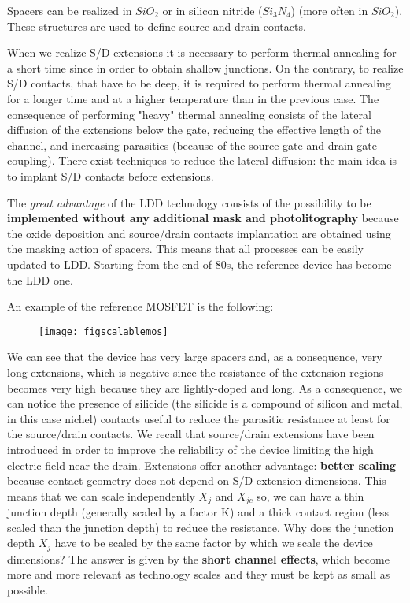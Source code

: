 \documentclass[a4paper, 12pt, twoside, openright]{report}
\begin{document}
{Spacers can be realized in $SiO_{2}$ or in silicon nitride ($Si_{3}N_{4}$) (more often in $SiO_{2}$). These structures are used to define source and drain contacts.

When we realize S/D extensions it is necessary to perform thermal annealing for a short time since in order to obtain shallow junctions. On the contrary, to realize S/D contacts, that have to be deep, it is required to perform thermal annealing for a longer time and at a higher temperature than in the previous case. The consequence of performing "heavy" thermal annealing consists of the lateral diffusion of the extensions below the gate, reducing the effective length of the channel, and increasing parasitics (because of the source-gate and drain-gate coupling). There exist techniques to reduce the lateral diffusion: the main idea is to implant S/D contacts before extensions.

The \emph{great advantage} of the LDD technology consists of the possibility to be \textbf{implemented without any additional mask and photolitography} because the oxide deposition and source/drain contacts implantation are obtained using the masking action of spacers. This means that all processes can be easily updated to LDD. Starting from the end of 80s, the reference device has become the LDD one. 

An example of the reference MOSFET is the following:

\newpage

	\begin{figure}[H]
	\centering
	\texttt{[image: figscalablemos]}
	\caption{}
	\label{}
	\end{figure}

We can see that the device has very large spacers and, as a consequence, very long extensions, which is negative since the resistance of the extension regions becomes very high because they are lightly-doped and long. As a consequence, we can notice the presence of silicide (the silicide is a compound of silicon and metal, in this case nichel) contacts useful to reduce the parasitic resistance at least for the source/drain contacts. We recall that source/drain extensions have been introduced in order to improve the reliability of the device limiting the high electric field near the drain. Extensions offer another advantage: \textbf{better scaling} because contact geometry does not depend on S/D extension dimensions. This means that we can scale independently $X_{j}$ and $X_{jc}$ so, we can have a thin junction depth (generally scaled by a factor K) and a thick contact region (less scaled than the junction depth) to reduce the resistance. Why does the junction depth $X_{j}$ have to be scaled by the same factor by which we scale the device dimensions? The answer is given by the \textbf{short channel effects}, which become more and more relevant as technology scales and they must be kept as small as possible. \\



}
\end{document}
